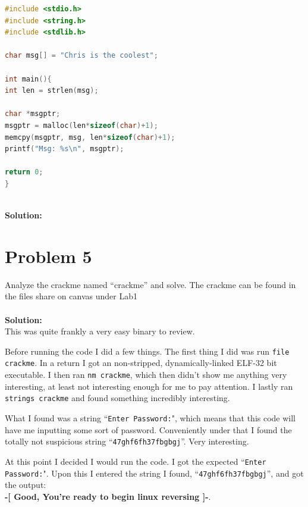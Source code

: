 \documentclass[12pt]{article}
\newcommand\tab[1][0.5cm]{\hspace*{#1}}
\begin{document}
\begin{lstlisting}[language=C]
#include <stdio.h>
#include <string.h>
#include <stdlib.h>

char msg[] = "Chris is the coolest";

int main(){
int len = strlen(msg);

char *msgptr;
msgptr = malloc(len*sizeof(char)+1);
memcpy(msgptr, msg, len*sizeof(char)+1);
printf("Msg: %s\n", msgptr);

return 0;
}
\end{lstlisting}
\textbf{\\Solution:\\} 



\newpage

\section{Problem 5}
\tab Analyze the crackme named “crackme” and solve. The crackme can be found in the files share
on canvas under Lab1
\\ \\
\textbf{Solution:} \\ 

This was quite frankly a very easy binary to review.

Before running the code I did a few things. The first thing I did was run \texttt{file crackme}. In a return I got an non-stripped,
dynamically-linked ELF-32 bit executable. I then ran \texttt{nm crackme}, which then didn't show me anything very interesting, at least not
interesting enough for me to pay attention. I lastly ran \texttt{strings crackme} and found something incredibly interesting.

What I found was a string ``\texttt{Enter Password:}", which means that this code will have me inputting some sort of password. 
Conveniently under that I found the totally not suspicious string ``\texttt{47ghf6fh37fbgbgj}''. Very interesting. 

At this point I decided I would run the code. I got the expected ``\texttt{Enter Password:}". Upon this I entered the string I found,
``\texttt{47ghf6fh37fbgbgj}'', and got the output: \\ 
\textbf{-[ Good, You're ready to begin linux reversing ]-}.
\end{document}
